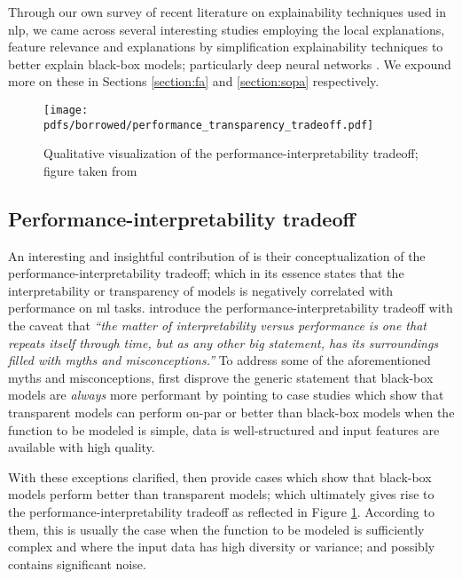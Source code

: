 Through our own survey of recent literature on explainability techniques used in
\ac{nlp}, we came across several interesting studies employing the local
explanations, feature relevance and explanations by simplification
explainability techniques to better explain black-box models; particularly deep
neural networks
\citep{schwartz2018sopa,peng2018rational,suresh-etal-2019-distilling,wang2019state,jiang2020cold}.
We expound more on these in Sections \ref{section:fa} and \ref{section:sopa}
respectively.

\begin{figure}[t]
  \centering
  \texttt{[image: pdfs/borrowed/performance\_transparency\_tradeoff.pdf]}
  \caption{Qualitative visualization of the performance-interpretability tradeoff;
    figure taken from \citet{arrieta2020explainable}}
  \label{fig:performance_interpretability_tradeoff}
\end{figure}

\subsection{Performance-interpretability tradeoff}

\label{section:performance_interpretability_tradeoff}

An interesting and insightful contribution of \citet{arrieta2020explainable} is
their conceptualization of the performance-interpretability tradeoff; which in
its essence states that the interpretability or transparency of models is
negatively correlated with performance on \ac{ml} tasks. \citet[Page 18, Section
5.1]{arrieta2020explainable} introduce the performance-interpretability tradeoff
with the caveat that \textit{``the matter of interpretability versus performance
  is one that repeats itself through time, but as any other big statement, has
  its surroundings filled with myths and misconceptions.''} To address some of
the aforementioned myths and misconceptions, \citet{arrieta2020explainable}
first disprove the generic statement that black-box models are
\textit{always} more performant by pointing to case studies which show that
transparent models can perform on-par or better than black-box models when the
function to be modeled is simple, data is well-structured and input
features are available with high quality.

With these exceptions clarified, \citet{arrieta2020explainable} then provide cases
which show that black-box models perform better than transparent models; which
ultimately gives rise to the performance-interpretability tradeoff as
reflected in Figure \ref{fig:performance_interpretability_tradeoff}. According to
them, this is usually the case when the function to be modeled is sufficiently
complex and where the input data has high diversity or variance; and possibly
contains significant noise.

